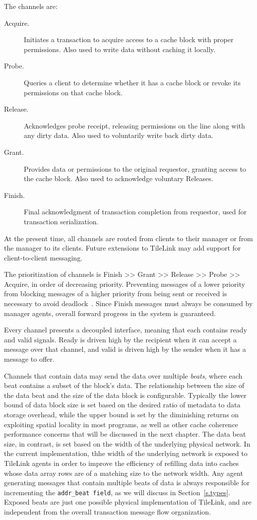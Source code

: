 The channels are:
\begin{description}
\item[Acquire.] Initiates a transaction to acquire access to a cache block with proper permissions. Also used to write data without caching it locally.
\item[Probe.] Queries a client to determine whether it has a cache block or revoke its permissions on that cache block.
\item[Release.] Acknowledges probe receipt, releasing permissions on the line along with any dirty data. Also used to voluntarily write back dirty data.
\item[Grant.] Provides data or permissions to the original requestor, granting access to the cache block. Also used to acknowledge voluntary Releases.
\item[Finish.] Final acknowledgment of transaction completion from requestor, used for transaction serialization.
\end{description}

At the present time, all channels are routed from clients to their manager or from the manager to its clients.
Future extensions to TileLink may add support for client-to-client messaging.

The prioritization of channels is Finish >> Grant >> Release >> Probe >> Acquire, in order of decreasing priority.
Preventing messages of a lower priority from blocking messages of a higher priority from being sent or received is necessary to avoid deadlock~\cite{sorin2011primer}.
Since Finish messages must always be consumed by manager agents, overall forward progress in the system is guaranteed.

Every channel presents a decoupled interface, meaning that each contains ready and valid signals.
Ready is driven high by the recipient when it can accept a message over that channel,
and valid is driven high by the sender when it has a message to offer.

Channels that contain data may send the data over multiple {\em beats}, where each beat contains a subset of the block's data.
The relationship between the size of the data beat and the size of the data block is configurable.
Typically the lower bound of data block size is set based on
the desired ratio of metadata to data storage overhead,
while the upper bound is set by the diminishing returns on exploiting spatial locality in most programs,
as well as other cache coherence performance concerns that will be discussed in the next chapter.
The data beat size, in contrast, is set based on the width of the underlying physical network.
In the current implementation, thhe width of the underlying network is exposed to TileLink agents in order to
improve the efficiency of refilling data into caches whose data array rows are of a matching size to the network width.
Any agent generating messages that contain multiple beats of data is always responsible for incrementing the {\tt addr\_beat field}, as we will discuss in Section~\ref{s.types}.
Exposed beats are just one possible physical implementation of TileLink, and are independent from the overall transaction message flow organization.

